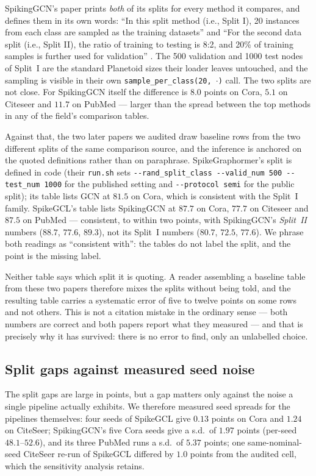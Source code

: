 SpikingGCN's paper prints \emph{both} of its splits for every method it compares, and defines them
in its own words: ``In this split method (i.e., Split I), 20 instances from each class are sampled
as the training datasets'' and ``For the second data split (i.e., Split II), the ratio of training
to testing is 8:2, and 20\% of training samples is further used for validation''
\citep{zhu2022spiking}. The 500 validation and 1000 test nodes of Split~I are the standard
Planetoid sizes their loader leaves untouched, and the sampling is visible in their own
\texttt{sample\_per\_class(20, $\cdot$)} call. The two splits are not close. For SpikingGCN itself
the difference is $8.0$ points on Cora, $5.1$ on Citeseer and $11.7$ on PubMed --- larger than the
spread between the top methods in any of the field's comparison tables.

Against that, the two later papers we audited draw baseline rows from the two different splits of
the same comparison source, and the
inference is anchored on the quoted definitions rather than on paraphrase. SpikeGraphormer's split
is defined in code (their \texttt{run.sh} sets \texttt{-{-}rand\_split\_class -{-}valid\_num 500
-{-}test\_num 1000} for the published setting and \texttt{-{-}protocol semi} for the public split);
its table lists GCN at $81.5$ on Cora, which is consistent with the Split~I family.
SpikeGCL's table lists SpikingGCN at $87.7$ on Cora, $77.7$ on Citeseer and $87.5$ on PubMed ---
consistent, to within two points, with SpikingGCN's \emph{Split~II} numbers ($88.7$, $77.6$, $89.3$),
not its Split~I numbers ($80.7$, $72.5$, $77.6$). We phrase both readings as ``consistent with'':
the tables do not label the split, and the point is the missing label.

Neither table says which split it is quoting. A reader assembling a baseline table from these two
papers therefore mixes the splits without being told, and the resulting table carries a systematic
error of five to twelve points on some rows and not others. This is not a citation mistake in the
ordinary sense --- both numbers are correct and both papers report what they measured --- and that is
precisely why it has survived: there is no error to find, only an unlabelled choice.


\subsection{Split gaps against measured seed noise}
\label{sec:transport}

The split gaps are large in points, but a gap matters only against the noise a single pipeline
actually exhibits. We therefore measured seed spreads for the pipelines themselves: four seeds of
SpikeGCL give $0.13$ points on Cora and $1.24$ on CiteSeer; SpikingGCN's five Cora seeds give a
s.d.\ of $1.97$ points (per-seed $48.1$--$52.6$), and its three PubMed runs a s.d.\ of $5.37$
points; one same-nominal-seed CiteSeer re-run of SpikeGCL differed by $1.0$ points from the
audited cell, which the sensitivity analysis retains.

